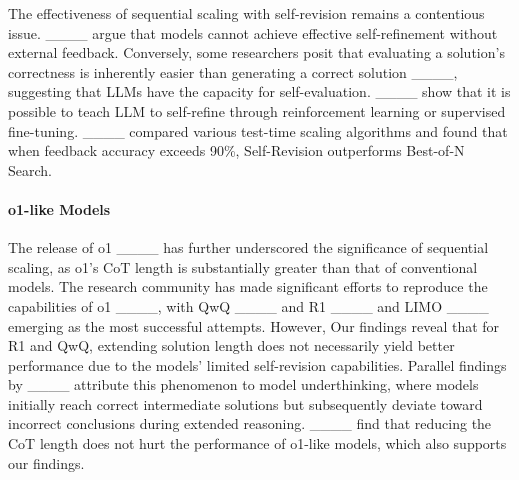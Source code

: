 The effectiveness of sequential scaling with self-revision remains a contentious issue. ____ argue that models cannot achieve effective self-refinement without external feedback. Conversely, some researchers posit that evaluating a solution’s correctness is inherently easier than generating a correct solution ____, suggesting that LLMs have the capacity for self-evaluation. ____ show that it is possible to teach LLM to self-refine through reinforcement learning or supervised fine-tuning. ____ compared various test-time scaling algorithms and found that when feedback accuracy exceeds 90\%, Self-Revision outperforms Best-of-N Search.

\paragraph{o1-like Models} The release of o1 ____ has further underscored the significance of sequential scaling, as o1’s CoT length is substantially greater than that of conventional models. The research community has made significant efforts to reproduce the capabilities of o1 ____, with QwQ ____ and R1 ____ and LIMO ____ emerging as the most successful attempts. However, Our findings reveal that for R1 and QwQ, extending solution length does not necessarily yield better performance due to the models’ limited self-revision capabilities. Parallel findings by ____ attribute this phenomenon to model underthinking, where models initially reach correct intermediate solutions but subsequently deviate toward incorrect conclusions during extended reasoning. ____ find that reducing the CoT length does not hurt the performance of o1-like models, which also supports our findings.


